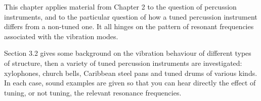   This chapter applies material from Chapter 2 to the question of percussion 
  instruments, and to the particular question of how a tuned percussion 
  instrument differs from a non-tuned one. It all hinges on the pattern of 
  resonant frequencies associated with the vibration modes. 

  Section 3.2 gives some background on the vibration behaviour of different 
  types of structure, then a variety of tuned percussion instruments are 
  investigated: xylophones, church bells, Caribbean steel pans and tuned drums 
  of various kinds. In each case, sound examples are given so that you can hear 
  directly the effect of tuning, or not tuning, the relevant resonance 
  frequencies. 

